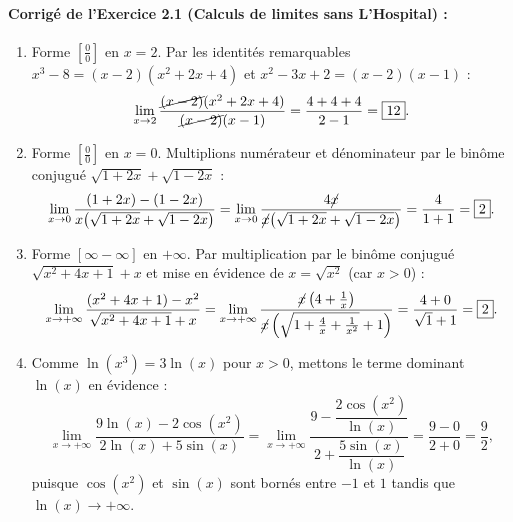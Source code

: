 \paragraph{Corrigé de l'Exercice 2.1 (Calculs de limites sans L'Hospital) :}
\begin{enumerate}[label=(\alph*)]
    \item Forme $\left[\frac{0}{0}\right]$ en $x = 2$. Par les identités remarquables $x^3 - 8 = (x-2)(x^2 + 2x + 4)$ et $x^2 - 3x + 2 = (x-2)(x-1)$ :
    \[
        \lim_{x \to 2} \frac{\cancel{(x-2)}(x^2 + 2x + 4)}{\cancel{(x-2)}(x - 1)} = \frac{4 + 4 + 4}{2 - 1} = \boxed{12}.
    \]
    \item Forme $\left[\frac{0}{0}\right]$ en $x = 0$. Multiplions numérateur et dénominateur par le binôme conjugué $\sqrt{1+2x} + \sqrt{1-2x}$ :
    \[
        \lim_{x \to 0} \frac{(1 + 2x) - (1 - 2x)}{x\bigl(\sqrt{1+2x} + \sqrt{1-2x}\bigr)} = \lim_{x \to 0} \frac{4\cancel{x}}{\cancel{x}\bigl(\sqrt{1+2x} + \sqrt{1-2x}\bigr)} = \frac{4}{1 + 1} = \boxed{2}.
    \]
    \item Forme $[\infty - \infty]$ en $+\infty$. Par multiplication par le binôme conjugué $\sqrt{x^2+4x+1} + x$ et mise en évidence de $x = \sqrt{x^2}$ (car $x > 0$) :
    \[
        \lim_{x \to +\infty} \frac{(x^2 + 4x + 1) - x^2}{\sqrt{x^2+4x+1} + x} = \lim_{x \to +\infty} \frac{\cancel{x}\left(4 + \frac{1}{x}\right)}{\cancel{x}\left(\sqrt{1 + \frac{4}{x} + \frac{1}{x^2}} + 1\right)} = \frac{4 + 0}{\sqrt{1} + 1} = \boxed{2}.
    \]
    \item Comme $\ln(x^3) = 3\ln(x)$ pour $x > 0$, mettons le terme dominant $\ln(x)$ en évidence :
    \[
        \lim_{x \to +\infty} \frac{9\ln(x) - 2\cos(x^2)}{2\ln(x) + 5\sin(x)} = \lim_{x \to +\infty} \frac{9 - \dfrac{2\cos(x^2)}{\ln(x)}}{2 + \dfrac{5\sin(x)}{\ln(x)}} = \frac{9 - 0}{2 + 0} = \boxed{\frac{9}{2}},
    \]
    puisque $\cos(x^2)$ et $\sin(x)$ sont bornés entre $-1$ et $1$ tandis que $\ln(x) \to +\infty$.
\end{enumerate}

